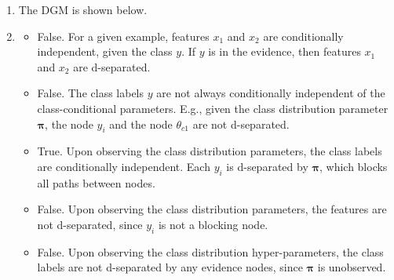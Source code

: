 \documentclass[submit]{harvardml}
\begin{document}
\begin{enumerate}[label=(\alph*)]
	\item The DGM is shown below.
	\begin{center}
	\end{center}
	
	\item 
	\begin{itemize}
		\item False. For a given example, features $x_1$ and $x_2$ are conditionally independent, given the class $y$. If $y$ is in the evidence, then features $x_1$ and $x_2$ are d-separated. 
		\item False. The class labels $y$ are not always conditionally independent of the class-conditional parameters. E.g., given the class distribution parameter $\bm{\pi}$, the node $y_i$ and the node $\theta_{c1}$ are not d-separated.
		\item True. Upon observing the class distribution parameters, the class labels are conditionally independent. Each $y_i$ is d-separated by $\bm{\pi}$, which blocks all paths between nodes.
		\item False. Upon observing the class distribution parameters, the features are not d-separated, since $y_i$ is not a blocking node.
		\item False. Upon observing the class distribution hyper-parameters, the class labels are not d-separated by any evidence nodes, since $\bm{\pi}$ is unobserved.
	\end{itemize}


\end{enumerate}
\end{document}
